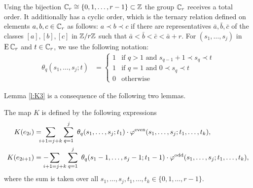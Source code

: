 Using the bijection $\mathbb{C}_r \cong \{0,1,\dots,r-1\} \subset \mathbb{Z}$ the group $\mathbb{C}_r$ receives a total order.
It additionally has a cyclic order, which is the ternary relation defined on elements $a,b,c \in \mathbb{C}_r$ as follows:
$a \prec b \prec c$ if there are representatives $\bar{a},\bar{b},\bar{c}$ of the classes $[a],[b],[c]$ in $\mathbb{Z}/r\mathbb{Z}$ such that $\bar{a} < \bar{b} < \bar{c} < \bar{a}+r$.
For $(s_1,\dots,s_j)$ in $\operatorname{E}\mathbb{C}_r$ and $t\in \mathbb{C}_r$, we use the following notation:
\begin{align*}
	\theta_q(s_1,\ldots,s_j;t) &=
	\begin{cases}
		1 & \text{if $q>1$ and $s_{q-1}+1\prec s_q\prec t$}\\
		1 & \text{if $q=1$ and $0\prec s_q\prec t$} \\
		0 & \text{otherwise}
	\end{cases}
\end{align*}

Lemma \ref{l:K3} is a consequence of the following two lemmas.

\begin{lemma}
	The map $K$ is defined by the following expressions
	\begin{align}
		\label{eq:homotopyK'1}
		K(e_{2i}) &= \ \sum_{\mathclap{i+1 = j+k}} \quad \sum_{q=1}^j \
		\theta_q(s_1,\dots,s_j;t_1)\cdot \varphi^{\mathrm{even}}(s_1,\dots,s_j;t_1,\dots,t_k), \\
		\label{eq:homotopyK'2}
		K(e_{2i+1}) &= -\sum_{\mathclap{i+1 = j+k}} \quad \sum_{\mathclap{q=1}}^j \
		\theta_q(s_1-1,\dots,s_j-1;t_1-1)\cdot \varphi^{\mathrm{odd}}(s_1,\dots,s_j;t_1,\dots,t_k),
	\end{align}
	where the sum is taken over all $s_1,\dots,s_j,t_1,\dots,t_k\in \{0,1,\dots,r-1\}$.
\end{lemma}

